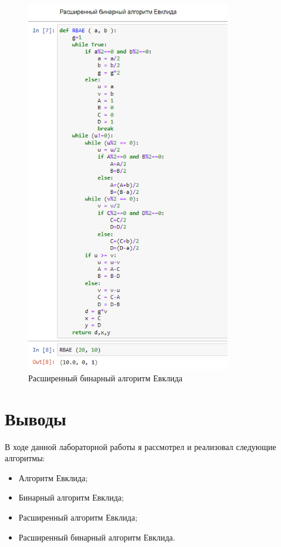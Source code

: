 \documentclass[
  12pt,
  a4paper,
]{scrreprt}
\begin{document}
\begin{figure}
\centering
\includegraphics[width=0.8\textwidth,height=\textheight]{./tex2pdf.-e48f57e5a48111ba/image/4.png}
\caption{Расширенный бинарный алгоритм Евклида}\label{fig:004}
\end{figure}

\chapter{Выводы}\label{ux432ux44bux432ux43eux434ux44b}

В ходе данной лабораторной работы я рассмотрел и реализовал следующие
алгоритмы:

\begin{itemize}
\item
  Алгоритм Евклида;
\item
  Бинарный алгоритм Евклида;
\item
  Расширенный алгоритм Евклида;
\item
  Расширенный бинарный алгоритм Евклида.
\end{itemize}
\end{document}
